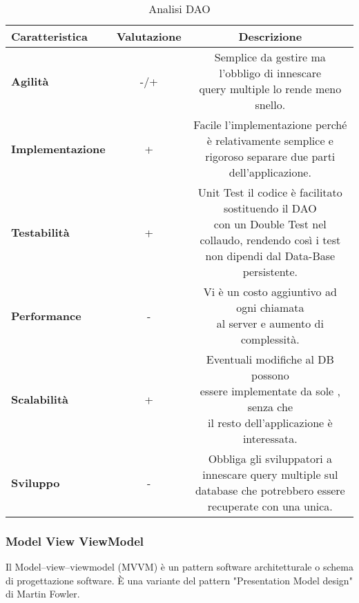 {{{\begin{itemize}
				\small %
				{\renewcommand\arraystretch{1.2} %
					\begin{center} \begin{table} \begin{tabular}{|l|c|c|}
						\hline
						{\textbf{Caratteristica}}&{\textbf{Valutazione}}&{\textbf{Descrizione}}\\
						\hline
						\textbf{Agilità} & -/+ &  \minitab[c]{Semplice da gestire ma l'obbligo di innescare\\ query multiple lo rende meno snello.} \\
						\hline
						\textbf{Implementazione} & + &  \minitab[c]{Facile l'implementazione perché è relativamente semplice e\\ rigoroso separare due parti dell'applicazione.} \\
						\hline
						\textbf{Testabilità} & + & \minitab[c]{Unit Test il codice è facilitato sostituendo il DAO\\ con un Double Test nel collaudo, rendendo così i test\\ non dipendi dal Data-Base persistente.} \\
						\hline
						\textbf{Performance} & - &  \minitab[c]{Vi è un costo aggiuntivo ad ogni chiamata\\ al server e aumento di complessità.} \\
						\hline
						\textbf{Scalabilità} & + &  \minitab[c]{Eventuali modifiche al DB possono\\ essere implementate da sole , senza che\\ il resto dell'applicazione è interessata.} \\
						\hline
						\textbf{Sviluppo} & - &  \minitab[c]{Obbliga gli sviluppatori a innescare query multiple sul\\ database che potrebbero essere recuperate con una unica.} \\
						\hline
					\end{tabular}
				\caption{Analisi DAO}
				\label{ADAO}
			\end{table}	
			 \end{center}
				}
			\end{itemize}
		}
	
		\subsubsection{Model View ViewModel}{
			Il Model–view–viewmodel (MVVM) è un pattern software architetturale o schema di progettazione software. È una variante del pattern "Presentation Model design" di Martin Fowler.
			
}}}

